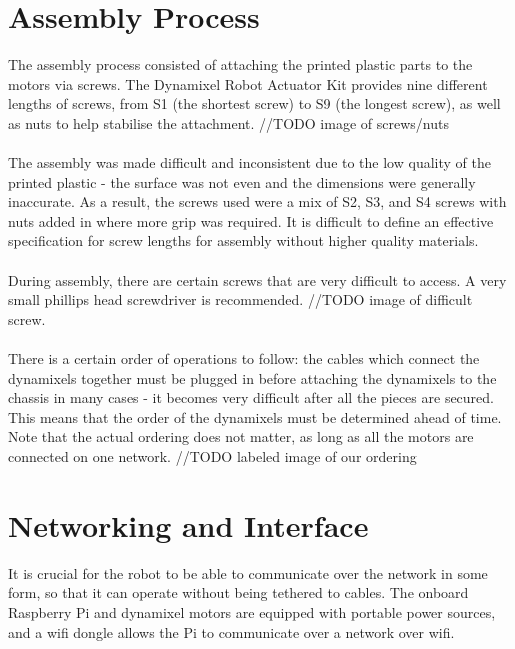\documentclass[]{article}
\begin{document}
\section{Assembly Process}
The assembly process consisted of attaching the printed plastic parts to the motors via screws. The Dynamixel Robot Actuator Kit provides nine different lengths of screws, from S1 (the shortest screw) to S9 (the longest screw), as well as nuts to help stabilise the attachment. //TODO image of screws/nuts
\\
\\
The assembly was made difficult and inconsistent due to the low quality of the printed plastic - the surface was not even and the dimensions were generally inaccurate. As a result, the screws used were a mix of S2, S3, and S4 screws with nuts added in where more grip was required. It is difficult to define an effective specification for screw lengths for assembly without higher quality materials. 
\\
\\
During assembly, there are certain screws that are very difficult to access. A very small phillips head screwdriver is recommended. //TODO image of difficult screw.
\\
\\
There is a certain order of operations to follow: the cables which connect the dynamixels together must be plugged in before attaching the dynamixels to the chassis in many cases - it becomes very difficult after all the pieces are secured. This means that the order of the dynamixels must be determined ahead of time. Note that the actual ordering does not matter, as long as all the motors are connected on one network. //TODO labeled image of our ordering


\section{Networking and Interface}
It is crucial for the robot to be able to communicate over the network in some form, so that it can operate without being tethered to cables. The onboard Raspberry Pi and dynamixel motors are equipped with portable power sources, and a wifi dongle allows the Pi to communicate over a network over wifi.
\end{document}
